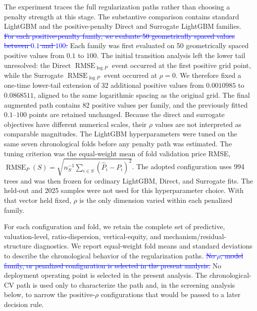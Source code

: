 \documentclass[10pt]{article}
\theoremstyle{definition}
\newcommand{\1}{\mathbf{1}}
\newcommand{\oldtext}[1]{\textcolor{blue}{\sout{#1}}}
\newcommand{\newtext}[1]{\textcolor{impGreen}{#1}}
\newcommand{\latesttext}[1]{\textcolor{latestPurple}{#1}}
\begin{document}
The experiment traces the full regularization paths rather than choosing a penalty
strength at this stage. 
\newtext{The substantive comparison contains standard LightGBM and the positive-penalty Direct and Surrogate LightGBM families.}
\oldtext{For each positive-penalty family, we evaluate 50 geometrically spaced values between $0.1$ and $100$.}
\latesttext{Each family was first evaluated on 50 geometrically spaced positive values from $0.1$ to $100$. The initial transition analysis left the lower tail unresolved: the Direct $\operatorname{RMSE}_{\log P}$ event occurred at the first positive grid point, while the Surrogate $\operatorname{RMSE}_{\log P}$ event occurred at $\rho=0$. We therefore fixed a one-time lower-tail extension of 32 additional positive values from $0.0010985$ to $0.0868511$, aligned to the same logarithmic spacing as the original grid. The final augmented path contains 82 positive values per family, and the previously fitted $0.1$--$100$ points are retained unchanged.}
Because the direct and surrogate objectives have different numerical scales, their $\rho$
values are not interpreted as comparable magnitudes. The LightGBM hyperparameters were tuned on the same seven chronological folds before any penalty path was estimated. The tuning criterion was the equal-weight mean of fold validation price RMSE, $\operatorname{RMSE}_P(S)=\sqrt{n_S^{-1}\sum_{i\in S}(\widehat P_i-P_i)^2}$. The adopted configuration uses 994 trees and was then frozen for ordinary LightGBM, Direct, and Surrogate fits. The held-out and 2025 samples were not used for this hyperparameter choice. With that vector held fixed, $\rho$ is the only dimension varied within each penalized family.


For each configuration and fold, we retain the complete set of predictive,
valuation-level, ratio-dispersion, vertical-equity, and mechanism/residual-structure diagnostics.
We report equal-weight fold means and standard deviations to describe the
chronological behavior of the regularization paths.
\oldtext{No $\rho$, model family, or penalized configuration is selected in the present analysis.}
\latesttext{No deployment operating point is selected in the present analysis. The chronological-CV path is used only to characterize the path and, in the screening analysis below, to narrow the positive-$\rho$ configurations that would be passed to a later decision rule.}
\end{document}
